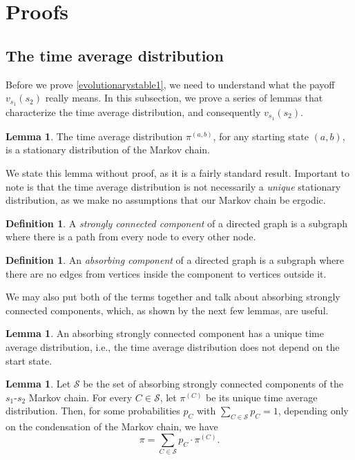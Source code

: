 \documentclass[11pt]{amsart}
\theoremstyle{definition}
\newtheorem{definition}[theorem]{Definition}
\newtheorem{lemma}[theorem]{Lemma}
\theoremstyle{remark}
\begin{document}
\section{Proofs}

\subsection{The time average distribution}

Before we prove \cref{evolutionarystable1}, we need to understand what the payoff $v_{s_1}(s_2)$ really means. In this subsection, we prove a series of lemmas that characterize the time average distribution, and consequently $v_{s_1}(s_2)$.

\begin{lemma}
  \label{timeaverageisstationary}
  The time average distribution $\pi^{(a,b)}$, for any starting state $(a,b)$, is a stationary distribution of the Markov chain.
\end{lemma}

We state this lemma without proof, as it is a fairly standard result. Important to note is that the time average distribution is not necessarily a \textit{unique} stationary distribution, as we make no assumptions that our Markov chain be ergodic.

\begin{definition}
  A \textit{strongly connected component} of a directed graph is a subgraph where there is a path from every node to every other node.
\end{definition}

\begin{definition}
  An \textit{absorbing component} of a directed graph is a subgraph where there are no edges from vertices inside the component to vertices outside it.
\end{definition}

We may also put both of the terms together and talk about absorbing strongly connected components, which, as shown by the next few lemmas, are useful.

\begin{lemma}
  An absorbing strongly connected component has a unique time average distribution, i.e., the time average distribution does not depend on the start state.
\end{lemma}

\begin{lemma}
  \label{timeaveragedistributiondecomposition}
  Let $\mathcal{S}$ be the set of absorbing strongly connected components of the $s_1$-$s_2$ Markov chain. For every $C \in \mathcal{S}$, let $\pi^{(C)}$ be its unique time average distribution. Then, for some probabilities $p_C$ with $\sum_{C \in \mathcal{S}} p_C = 1$, depending only on the condensation of the Markov chain, we have \begin{equation*}
    \pi = \sum_{C \in \mathcal{S}} p_C \cdot \pi^{(C)}.
  \end{equation*}
\end{lemma}
\end{document}
